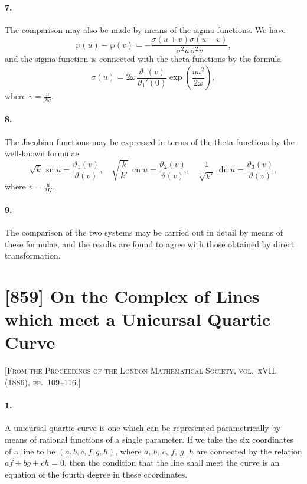 \documentclass[11pt,a4paper]{article}
\theoremstyle{definition}
\begin{document}
\paragraph{7.} The comparison may also be made by means of the sigma-functions. We have
\[
\wp(u) - \wp(v) = -\frac{\sigma(u + v)\sigma(u - v)}{\sigma^{2}u\,\sigma^{2}v},
\]
and the sigma-function is connected with the theta-functions by the formula
\[
\sigma(u) = 2\omega\,\frac{\vartheta_{1}(v)}{\vartheta_{1}'(0)}\exp\left(\frac{\eta u^{2}}{2\omega}\right),
\]
where $v = \frac{u}{2\omega}$.

\paragraph{8.} The Jacobian functions may be expressed in terms of the theta-functions by the well-known formulae
\[
\sqrt{k}\,\operatorname{sn} u = \frac{\vartheta_{1}(v)}{\vartheta(v)}, \quad
\sqrt{\frac{k}{k'}}\,\operatorname{cn} u = \frac{\vartheta_{2}(v)}{\vartheta(v)}, \quad
\frac{1}{\sqrt{k'}}\,\operatorname{dn} u = \frac{\vartheta_{3}(v)}{\vartheta(v)},
\]
where $v = \frac{u}{2K}$.

\paragraph{9.} The comparison of the two systems may be carried out in detail by means of these formulae, and the results are found to agree with those obtained by direct transformation.

\newpage
\section*{[859] On the Complex of Lines which meet a Unicursal Quartic Curve}

\noindent\textsc{[From the Proceedings of the London Mathematical Society, vol.~xVII. (1886), pp.~109--116.]}

\smallskip

\paragraph{1.} A unicursal quartic curve is one which can be represented parametrically by means of rational functions of a single parameter. If we take the six coordinates of a line to be $(a, b, c, f, g, h)$, where $a$, $b$, $c$, $f$, $g$, $h$ are connected by the relation $af + bg + ch = 0$, then the condition that the line shall meet the curve is an equation of the fourth degree in these coordinates.
\end{document}
